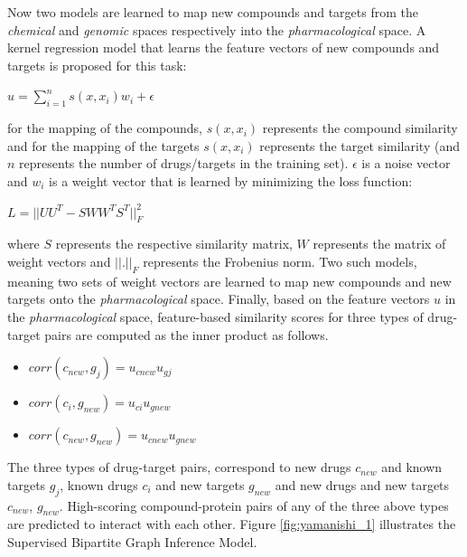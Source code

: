 Now two models are learned to map new compounds and targets from the \textit{chemical} and \textit{genomic} spaces respectively into the \textit{pharmacological} space. A kernel regression model that learns the feature vectors of new compounds and targets is proposed for this task:
\begin{center}
$u=\sum\limits_{i=1}^{n}s(x,x_i)w_i+\epsilon$
\end{center}

for the mapping of the compounds, $s(x,x_i)$ represents the compound similarity and for the mapping of the targets $s(x,x_i)$ represents the target similarity (and $n$ represents the number of drugs/targets in the training set). $\epsilon$ is a noise vector and $w_i$ is a weight vector that is learned by minimizing the loss function:
\begin{center}
$L=||UU^T - SWW^TS^T||^2_F$
\end{center}
where $S$ represents the respective similarity matrix, $W$ represents the matrix of weight vectors and $||.||_F$ represents the Frobenius norm.
Two such models, meaning two sets of weight vectors are learned to map new compounds and new targets onto the \textit{pharmacological} space.
Finally, based on the feature vectors $u$ in the \textit{pharmacological} space, feature-based similarity scores for three types of drug-target pairs are computed as the inner product as follows. 
\begin{itemize}
\item $corr(c_{new}, g_j) = u_{cnew}u_{gj}$
\item $corr(c_i, g_{new}) = u_{ci}u_{gnew}$
\item $corr(c_{new},g_{new}) = u_{cnew}u_{gnew}$
\end{itemize}
The three types of drug-target pairs, correspond to new drugs $c_{new}$ and known targets $g_j$, known drugs $c_i$ and new targets $g_{new}$ and new drugs and new targets $c_{new}$, $g_{new}$.
High-scoring compound-protein pairs of any of the three above types are predicted to interact with each other. Figure \ref{fig:yamanishi_1} illustrates the Supervised Bipartite Graph Inference Model.

